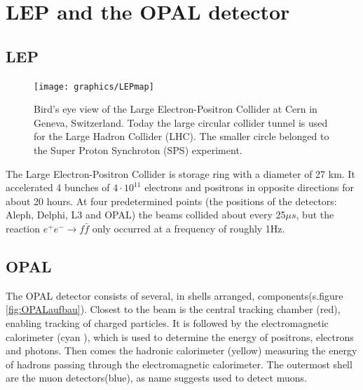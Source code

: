 \section{LEP and the OPAL detector}
\subsection{LEP}
\begin{figure}[ht]
	\centering
	\texttt{[image: graphics/LEPmap]}
	\caption[Bird's eye view LEP]{Bird's eye view of the Large Electron-Positron Collider at Cern in Geneva, Switzerland. Today the large circular collider tunnel is used for the Large Hadron Collider (LHC)\cite{jakobs}. The smaller circle belonged to the Super Proton Synchroton (SPS) experiment.}
	\label{fig:LEPmap}
\end{figure}
The Large Electron-Positron Collider is storage ring with a diameter of 27 km. It accelerated 4 bunches of $4\cdot 10^{11}$ electrons and positrons in opposite directions for about 20 hours. At four predetermined points (the positions of the detectors: Aleph, Delphi, L3 and OPAL) the beams collided about every 25$\mu s$, but the reaction $e^+ e^- \rightarrow f \bar{f}$ only occurred at a frequency of roughly 1Hz\cite{muenchen}.

\subsection{OPAL}
The OPAL detector consists of several, in shells arranged, components(s.figure \ref{fig:OPALaufbau}). Closest to the beam is the central tracking chamber (red), enabling tracking of charged particles. It is followed by the electromagnetic calorimeter (cyan ), which is used to determine the energy of positrons, electrons and photons.
Then comes the hadronic calorimeter (yellow) measuring the energy of hadrons passing through the electromagnetic calorimeter.
The outermost shell are the muon detectors(blue), as name suggests used to detect muons\cite{cern}.\\

